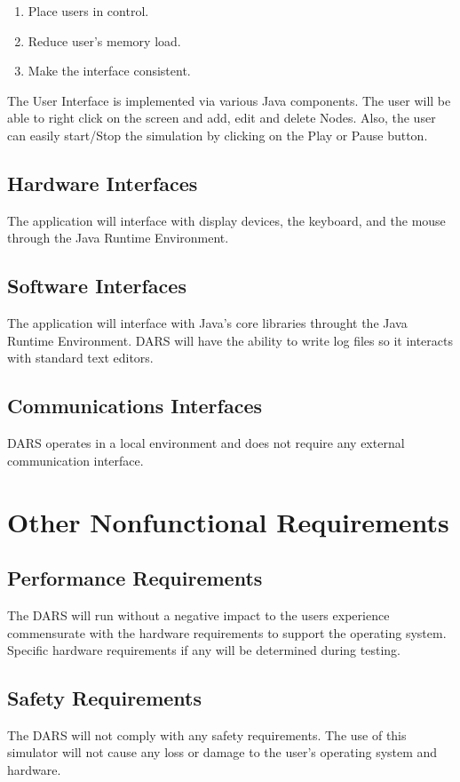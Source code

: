 \documentclass[a4paper,11pt,titlepage]{article}
\begin{document}
{\begin{enumerate}[1.]
  \item Place users in control.
  \item Reduce user’s memory load.
  \item Make the interface consistent.
\end{enumerate}

The User Interface is implemented via various Java components. The user will be able to right
click on the screen and add, edit and delete Nodes. Also, the user can easily start/Stop the
simulation by clicking on the Play or Pause button.
\subsection{Hardware Interfaces}
The application will interface with display devices, the keyboard, and the mouse through the
Java Runtime Environment.
\subsection{Software Interfaces}
The application will interface with Java’s core libraries throught the Java Runtime
Environment. DARS will have the ability to write log files so it interacts with standard text
editors.
\subsection{Communications Interfaces}
DARS operates in a local environment and does not require any external communication
interface.

\section{Other Nonfunctional Requirements}
\subsection{Performance Requirements}
The DARS will run without a negative impact to the users experience commensurate with the
hardware requirements to support the operating system. Specific hardware requirements if
any will be determined during testing.
\subsection{Safety Requirements}
The DARS will not comply with any safety requirements. The use of this simulator will not
cause any loss or damage to the user’s operating system and hardware.
}
\end{document}
